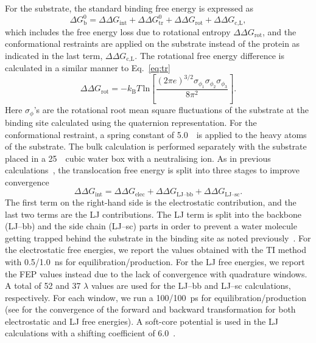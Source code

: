 For the substrate, the standard binding free energy is expressed as
\begin{equation}
    \Delta G_{\text{b}}^{0} = \Delta\Delta G_{\text{int}} + \Delta\Delta G_{\text{tr}}^{0} +
    \Delta\Delta 
G_{\text{rot}} + \Delta\Delta G_{\text{c,L}} ,
\end{equation}
which includes the free energy loss due to rotational entropy $\Delta\Delta G_{\text{rot}}$,
and the conformational restraints are applied on the substrate instead of the protein as indicated 
in the last term, $\Delta\Delta G_{\text{c,L}}$. 
The rotational free energy difference is calculated in a similar manner to Eq.~\eqref{eq:tr}~\cite{Carlsson2005}
\begin{equation}
    \Delta\Delta G_{\text{rot}} = -k_{\text{B}}T\, \text{ln} \left[\frac{(2\pi 
e)^{3/2}\sigma_{\phi_{1}}\sigma_{\phi_{2}}\sigma_{\phi_{3}}}{8\pi^2} \right] .
    \label{eq:rot}
\end{equation}
Here $\sigma_{\phi}$'s are the rotational root mean square fluctuations of the substrate
at the binding site calculated using the quaternion representation. For the conformational restraint, 
a spring constant of 5.0~\spring\ is applied to the heavy atoms of the substrate. The bulk 
calculation is performed separately with the substrate placed in a 25~\angs\ cubic water box with 
a neutralising ion. As in previous calculations~\cite{Heinzelmann2013,Heinzelmann2011}, the 
translocation free energy is split into three stages to improve convergence
\begin{equation}
    \Delta\Delta G_{\text{int}} = \Delta\Delta G_{\text{elec}} + \Delta\Delta G_{\text{LJ--bb}} +
    \Delta\Delta G_{\text{LJ--sc}}.
\end{equation}
The first term on the right-hand side is the electrostatic contribution, and the last two terms
are the LJ contributions. The LJ term is split into the backbone (LJ--bb) and the side chain (LJ--sc) 
parts in order to prevent a water molecule getting trapped behind the substrate in the binding site 
as noted previously~\cite{Heinzelmann2011}. For the electrostatic free energies, we report the values 
obtained with the TI method with 0.5/1.0~ns for equilibration/production. For the LJ free energies, we 
report the FEP values instead due to the lack of convergence with quadrature windows. A total of 52 and 
37 $\lambda$ values are used for the LJ--bb and LJ--sc calculations, respectively. For each window, we 
run a 100/100~ps for equilibration/production (see  for the convergence of the forward 
and backward transformation for both electrostatic and LJ free energies). A soft-core potential is 
used in the LJ calculations with a shifting coefficient of 6.0~\cite{Zacharias1994}. 

